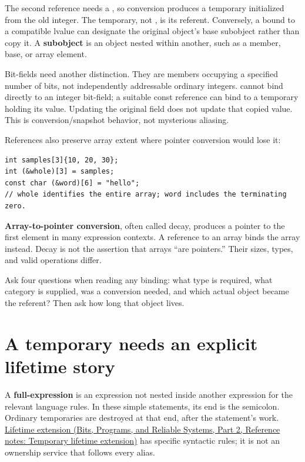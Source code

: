 The second reference needs a , so conversion produces a temporary  initialized from the old integer. The temporary, not , is its referent. Conversely, a  bound to a compatible  lvalue can designate the original object's base subobject rather than copy it. A \textbf{subobject} is an object nested within another, such as a member, base, or array element.

Bit-fields need another distinction. They are members occupying a specified number of bits, not independently addressable ordinary integers.  cannot bind directly to an integer bit-field; a suitable const reference can bind to a temporary holding its value. Updating the original field does not update that copied value. This is conversion/snapshot behavior, not mysterious aliasing.

References also preserve array extent where pointer conversion would lose it:

\begin{verbatim}
int samples[3]{10, 20, 30};
int (&whole)[3] = samples;
const char (&word)[6] = "hello";
// whole identifies the entire array; word includes the terminating zero.
\end{verbatim}

\textbf{Array-to-pointer conversion}, often called decay, produces a pointer to the first element in many expression contexts. A reference to an array binds the array instead. Decay is not the assertion that arrays ``are pointers.'' Their sizes, types, and valid operations differ.

Ask four questions when reading any binding: what type is required, what category is supplied, was a conversion needed, and which actual object became the referent? Then ask how long that object lives.

\section{A temporary needs an explicit lifetime story}\label{05-engine-i-ch003-a-temporary-needs-an-explicit-lifetime-story}

\hypertarget{05-engine-i-ch003-a-temporary-needs-an-explicit-lifetime-story}{}

A \textbf{full-expression} is an expression not nested inside another expression for the relevant language rules. In these simple statements, its end is the semicolon. Ordinary temporaries are destroyed at that end, after the statement's work. \href{../01-Bits-Programs-and-Reliable-Systems-P02/main.pdf\#nameddest=appendix-a978b29bbbb0}{Lifetime extension (Bits, Programs, and Reliable Systems, Part 2, Reference notes: Temporary lifetime extension)} has specific syntactic rules; it is not an ownership service that follows every alias.


